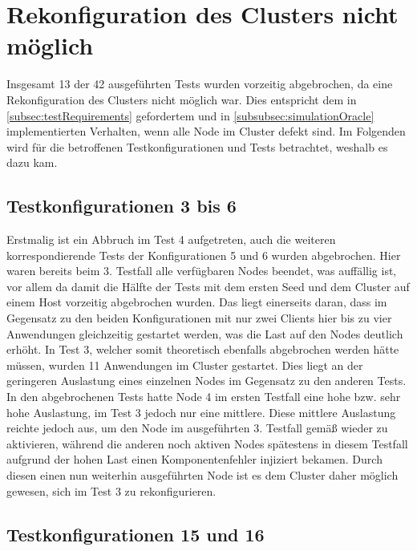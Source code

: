 \section{Rekonfiguration des Clusters nicht möglich}
\label{sec:noReconfig}

Insgesamt 13 der 42 ausgeführten Tests wurden vorzeitig abgebrochen, da eine Rekonfiguration des Clusters nicht möglich war.
Dies entspricht dem in \cref{subsec:testRequirements} gefordertem und in \cref{subsubsec:simulationOracle} implementierten Verhalten, wenn alle Node im Cluster defekt sind.
Im Folgenden wird für die betroffenen Testkonfigurationen und Tests betrachtet, weshalb es dazu kam.

\subsection{Testkonfigurationen 3 bis 6}
\label{subsec:noReconf36}

Erstmalig ist ein Abbruch im Test 4 aufgetreten, auch die weiteren korrespondierende Tests der Konfigurationen 5 und 6 wurden abgebrochen.
Hier waren bereits beim 3. Testfall alle verfügbaren Nodes beendet, was auffällig ist, vor allem da damit die Hälfte der Tests mit dem ersten Seed und dem Cluster auf einem Host vorzeitig abgebrochen wurden.
Das liegt einerseits daran, dass im Gegensatz zu den beiden Konfigurationen mit nur zwei Clients hier bis zu vier Anwendungen gleichzeitig gestartet werden, was die Last auf den Nodes deutlich erhöht.
In Test 3, welcher somit theoretisch ebenfalls abgebrochen werden hätte müssen, wurden 11 Anwendungen im Cluster gestartet.
Dies liegt an der geringeren Auslastung eines einzelnen Nodes im Gegensatz zu den anderen Tests.
In den abgebrochenen Tests hatte Node 4 im ersten Testfall eine hohe bzw. sehr hohe Auslastung, im Test 3 jedoch nur eine mittlere.
Diese mittlere Auslastung reichte jedoch aus, um den Node im ausgeführten 3. Testfall gemäß  wieder zu aktivieren, während die anderen noch aktiven Nodes spätestens in diesem Testfall aufgrund der hohen Last einen Komponentenfehler injiziert bekamen.
Durch diesen einen nun weiterhin ausgeführten Node ist es dem Cluster daher möglich gewesen, sich im Test 3 zu rekonfigurieren.

\subsection{Testkonfigurationen 15 und 16}
\label{subsec:noReconf1516}

